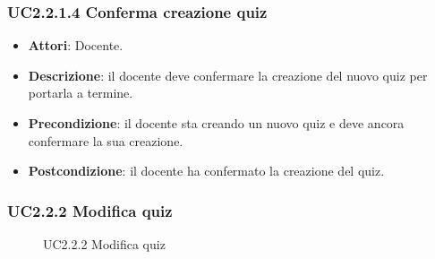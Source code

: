 \subsubsection{UC2.2.1.4 Conferma creazione quiz}
\begin{itemize}
\item \textbf{Attori}: Docente.
\item \textbf{Descrizione}: il docente deve confermare la creazione del nuovo quiz per portarla a termine.
\item \textbf{Precondizione}: il docente sta creando un nuovo quiz e deve ancora confermare la sua creazione.
\item \textbf{Postcondizione}: il docente ha confermato la creazione del quiz.
\end{itemize}
\subsubsection{UC2.2.2 Modifica quiz}
\begin{figure}[H]
\centering
\noindent{}
\caption{UC2.2.2 Modifica quiz}
\end{figure}
